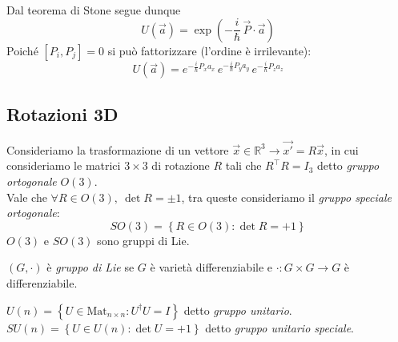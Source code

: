 Dal teorema di Stone segue dunque
\begin{equation}
    U(\vec a)=\exp\!\left(-\frac{i}{\hbar}\,\vec P\!\cdot\!\vec a\right)
\end{equation}
Poiché \([P_i,P_j]=0\) si può fattorizzare (l’ordine è irrilevante):
\[
U(\vec a)=e^{-\frac{i}{\hbar}P_x a_x}\,e^{-\frac{i}{\hbar}P_y a_y}\,e^{-\frac{i}{\hbar}P_z a_z}
\]


\subsection{Rotazioni 3D}

Consideriamo la trasformazione di un vettore \(\vec{x} \in \mathbb{R}^3 \to \vec{x'}= R\vec{x}\), in cui consideriamo le matrici \(3\times3\) di rotazione \(R \) tali che \(R^\intercal R = I_3\) detto \textit{gruppo ortogonale} \(O(3)\).\\
Vale che \(\forall R \in O(3), \ \det R = \pm 1 \), tra queste consideriamo il \textit{gruppo speciale ortogonale}:
\begin{equation}
    SO(3)= \left\{ R \in O(3): \det R = +1 \right\}
\end{equation}
\(O(3)\) e \(SO(3)\) sono gruppi di Lie.

\begin{definition}
    \((G, \cdot )\) è \textit{gruppo di Lie} se \(G\) è varietà differenziabile e \(\cdot : G \times G \to G \) è differenziabile. 
\end{definition}

\begin{example}
    \(U(n)=\left\{ U \in \text{Mat}_{n\times n } : U^\dagger U = I \right\}\) detto \textit{gruppo unitario}.\\
    \(SU(n) = \left\{ U \in U(n ) : \det U = +1 \right\}\) detto \textit{gruppo unitario speciale}.
\end{example}


